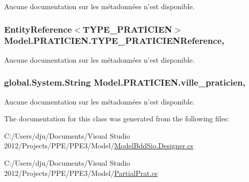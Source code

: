 Aucune documentation sur les métadonnées n'est disponible. 

\hypertarget{class_model_1_1_p_r_a_t_i_c_i_e_n_a3bc7693b4b3965bf78d0685094994c1e}{
\subsubsection[{T\-Y\-P\-E\-\_\-\-P\-R\-A\-T\-I\-C\-I\-E\-N\-Reference}]{\setlength{\rightskip}{0pt plus 5cm}Entity\-Reference$<${\bf T\-Y\-P\-E\-\_\-\-P\-R\-A\-T\-I\-C\-I\-E\-N}$>$ Model.\-P\-R\-A\-T\-I\-C\-I\-E\-N.\-T\-Y\-P\-E\-\_\-\-P\-R\-A\-T\-I\-C\-I\-E\-N\-Reference\hspace{0.3cm}{\ttfamily [get]}, {\ttfamily [set]}}}\label{class_model_1_1_p_r_a_t_i_c_i_e_n_a3bc7693b4b3965bf78d0685094994c1e}


Aucune documentation sur les métadonnées n'est disponible. 

\hypertarget{class_model_1_1_p_r_a_t_i_c_i_e_n_ae32f7c05fd2519a7a0b308ba1117856a}{
\subsubsection[{ville\-\_\-praticien}]{\setlength{\rightskip}{0pt plus 5cm}global.\-System.\-String Model.\-P\-R\-A\-T\-I\-C\-I\-E\-N.\-ville\-\_\-praticien\hspace{0.3cm}{\ttfamily [get]}, {\ttfamily [set]}}}\label{class_model_1_1_p_r_a_t_i_c_i_e_n_ae32f7c05fd2519a7a0b308ba1117856a}


Aucune documentation sur les métadonnées n'est disponible. 



The documentation for this class was generated from the following files\-:\begin{DoxyCompactItemize}
\item 
C\-:/\-Users/dju/\-Documents/\-Visual Studio 2012/\-Projects/\-P\-P\-E/\-P\-P\-E3/\-Model/\hyperlink{_model_bdd_sio_8_designer_8cs}{Model\-Bdd\-Sio.\-Designer.\-cs}\item 
C\-:/\-Users/dju/\-Documents/\-Visual Studio 2012/\-Projects/\-P\-P\-E/\-P\-P\-E3/\-Model/\hyperlink{_partial_prat_8cs}{Partial\-Prat.\-cs}\end{DoxyCompactItemize}
